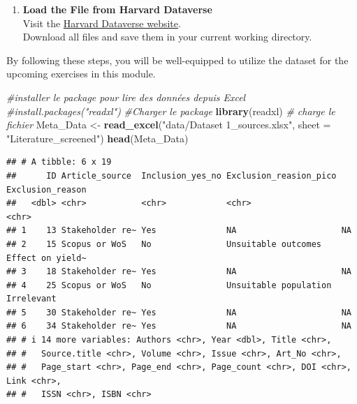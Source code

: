 \documentclass[
]{book}
\newenvironment{Shaded}{\begin{snugshade}}{\end{snugshade}}
\newcommand{\AttributeTok}[1]{\textcolor[rgb]{0.13,0.29,0.53}{#1}}
\newcommand{\CommentTok}[1]{\textcolor[rgb]{0.56,0.35,0.01}{\textit{#1}}}
\newcommand{\FunctionTok}[1]{\textcolor[rgb]{0.13,0.29,0.53}{\textbf{#1}}}
\newcommand{\NormalTok}[1]{#1}
\newcommand{\OtherTok}[1]{\textcolor[rgb]{0.56,0.35,0.01}{#1}}
\newcommand{\StringTok}[1]{\textcolor[rgb]{0.31,0.60,0.02}{#1}}
\providecommand{\tightlist}{%
  \setlength{\itemsep}{0pt}\setlength{\parskip}{0pt}}
\begin{document}
\begin{enumerate}
\def\labelenumi{\arabic{enumi}.}
\tightlist
\item
  \textbf{Load the File from Harvard Dataverse}\\
  Visit the \href{https://dataverse.harvard.edu/dataset.xhtml?persistentId=doi:10.7910/DVN/XIDI1X}{Harvard Dataverse website}.\\
  Download all files and save them in your current working directory.
\end{enumerate}

By following these steps, you will be well-equipped to utilize the dataset for the upcoming exercises in this module.\\

\begin{Shaded}
\begin{Highlighting}[]
\CommentTok{\#installer le package pour lire des données depuis Excel}
\CommentTok{\#install.packages("readxl")}
\CommentTok{\#Charger le package}
\FunctionTok{library}\NormalTok{(readxl)}
\CommentTok{\# charge le fichier}
\NormalTok{Meta\_Data }\OtherTok{\textless{}{-}} \FunctionTok{read\_excel}\NormalTok{(}\StringTok{"data/Dataset 1\_sources.xlsx"}\NormalTok{, }\AttributeTok{sheet =} \StringTok{"Literature\_screened"}\NormalTok{)}
\FunctionTok{head}\NormalTok{(Meta\_Data)}
\end{Highlighting}
\end{Shaded}

\begin{verbatim}
## # A tibble: 6 x 19
##      ID Article_source  Inclusion_yes_no Exclusion_reasion_pico Exclusion_reason
##   <dbl> <chr>           <chr>            <chr>                  <chr>           
## 1    13 Stakeholder re~ Yes              NA                     NA              
## 2    15 Scopus or WoS   No               Unsuitable outcomes    Effect on yield~
## 3    18 Stakeholder re~ Yes              NA                     NA              
## 4    25 Scopus or WoS   No               Unsuitable population  Irrelevant      
## 5    30 Stakeholder re~ Yes              NA                     NA              
## 6    34 Stakeholder re~ Yes              NA                     NA              
## # i 14 more variables: Authors <chr>, Year <dbl>, Title <chr>,
## #   Source.title <chr>, Volume <chr>, Issue <chr>, Art_No <chr>,
## #   Page_start <chr>, Page_end <chr>, Page_count <chr>, DOI <chr>, Link <chr>,
## #   ISSN <chr>, ISBN <chr>
\end{verbatim}
\end{document}
